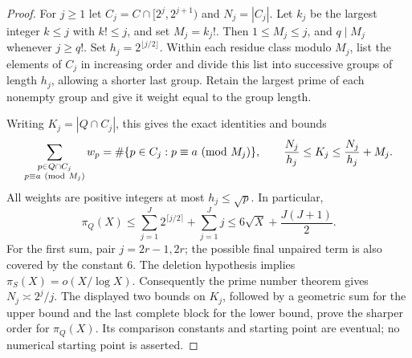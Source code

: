 \documentclass[11pt]{article}
\theoremstyle{definition}
\begin{document}
\begin{proof}
For $j\ge1$ let $C_j=C\cap[2^j,2^{j+1})$ and $N_j=|C_j|$.
Let $k_j$ be the largest integer $k\le j$ with $k!\le j$,
and set $M_j=k_j!$. Then $1\le M_j\le j$, and
$q\mid M_j$ whenever $j\ge q!$.
Set $h_j=2^{\lfloor j/2\rfloor}$.
Within each residue class modulo $M_j$, list the elements
of $C_j$ in increasing order and divide this list into
successive groups of length $h_j$, allowing a shorter last
group. Retain the largest prime of each nonempty group and
give it weight equal to the group length.

Writing $K_j=|Q\cap C_j|$, this gives the exact identities
and bounds
\[
 \sum_{\substack{p\in Q\cap C_j\\p\equiv a\ ({\rm mod}\ M_j)}}w_p
   =\#\{p\in C_j:p\equiv a\ ({\rm mod}\ M_j)\},\qquad
 \frac{N_j}{h_j}\le K_j\le\frac{N_j}{h_j}+M_j.
\]
All weights are positive integers at most $h_j\le\sqrt p$.
In particular,
\[
 \pi_Q(X)\le
 \sum_{j=1}^J2^{\lceil j/2\rceil}+\sum_{j=1}^Jj
 \le6\sqrt X+\frac{J(J+1)}2.
\]
For the first sum, pair $j=2r-1,2r$; the possible final
unpaired term is also covered by the constant $6$.
The deletion hypothesis implies $\pi_S(X)=o(X/\log X)$.
Consequently the prime number theorem gives
$N_j\asymp2^j/j$. The displayed two bounds on $K_j$, followed
by a geometric sum for the upper bound and the last complete
block for the lower bound, prove the sharper order for
$\pi_Q(X)$. Its comparison constants and starting point
are eventual; no numerical starting point is asserted.


\end{proof}
\end{document}
